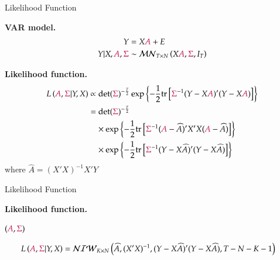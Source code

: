 \documentclass[notes,blackandwhite,mathsans,usenames,dvipsnames]{beamer}
\begin{document}
\begin{frame}{Likelihood Function}

\textbf{VAR model.}
\begin{align*} 
Y &= X{\color{purple}A} +E\\
Y|X,{\color{purple}A}, {\color{purple}\Sigma} &\sim\mathcal{MN}_{T\times N}\left(X{\color{purple}A},{\color{purple}\Sigma},I_T\right)
\end{align*} 

\textbf{Likelihood function.}\small
\begin{align*} 
L\left( {\color{purple}A},{\color{purple}\Sigma}|Y,X \right) &\propto 
\text{det}({\color{purple}\Sigma})^{-\frac{T}{2}}\exp\left\{ -\frac{1}{2}\text{tr}\left[ {\color{purple}\Sigma}^{-1}(Y-X{\color{purple}A})'(Y-X{\color{purple}A}) \right] \right\}\\
&=\text{det}({\color{purple}\Sigma})^{-\frac{T}{2}}\\
&\quad\times\exp\left\{ -\frac{1}{2}\text{tr}\left[ {\color{purple}\Sigma}^{-1}({\color{purple}A}-\widehat{A})'X'X({\color{purple}A}-\widehat{A}) \right] \right\}\\
&\quad\times \exp\left\{ -\frac{1}{2}\text{tr}\left[ {\color{purple}\Sigma}^{-1}(Y-X\widehat{A})'(Y-X\widehat{A}) \right] \right\}
\end{align*} 
{\color{mcxs2}where} $\widehat{A}=(X'X)^{-1}X'Y$
\end{frame}





\begin{frame}{Likelihood Function}

\textbf{Likelihood function.}

 $({\color{purple}A},{\color{purple}\Sigma})$\small
\begin{adjustwidth}{-0.5cm}{0cm}
\begin{align*} 
L\left( {\color{purple}A},{\color{purple}\Sigma}|Y,X \right) &= \mathcal{NIW}_{K\times N}\left(\widehat{A},(X'X)^{-1},(Y-X\widehat{A})'(Y-X\widehat{A}), T-N-K-1 \right)
\end{align*} 
\end{adjustwidth}
\end{frame}
\end{document}
